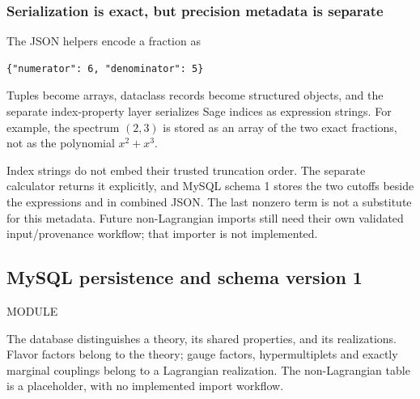\documentclass[11pt,a4paper]{article}
\numberwithin{equation}{section}
\newcommand{\file}[1]{\par{\small\sffamily\color{muted}MODULE \quad\texttt{\detokenize{#1}}}\par}
\begin{document}
\subsubsection{Serialization is exact, but precision metadata is separate}
The JSON helpers encode a fraction as
\begin{lstlisting}
{"numerator": 6, "denominator": 5}
\end{lstlisting}
Tuples become arrays, dataclass records become structured objects, and the
separate index-property layer serializes Sage indices as expression strings. For
example, the spectrum $(2,3)$ is stored as an array of the two exact fractions,
not as the polynomial $x^2+x^3$.

Index strings do not embed their trusted truncation order. The separate
calculator returns it explicitly, and MySQL schema 1 stores the two cutoffs
beside the expressions and in combined JSON. The last nonzero term is not a
substitute for this metadata. Future non-Lagrangian imports still need their
own validated input/provenance workflow; that importer is not implemented.

\clearpage
\subsection{MySQL persistence and schema version 1}\label{sec:db}
\file{common/n2_theory_db.py}
The database distinguishes a theory, its shared properties, and its realizations.
Flavor factors belong to the theory; gauge factors, hypermultiplets and exactly
marginal couplings belong to a Lagrangian realization. The non-Lagrangian table
is a placeholder, with no implemented import workflow.
\end{document}

